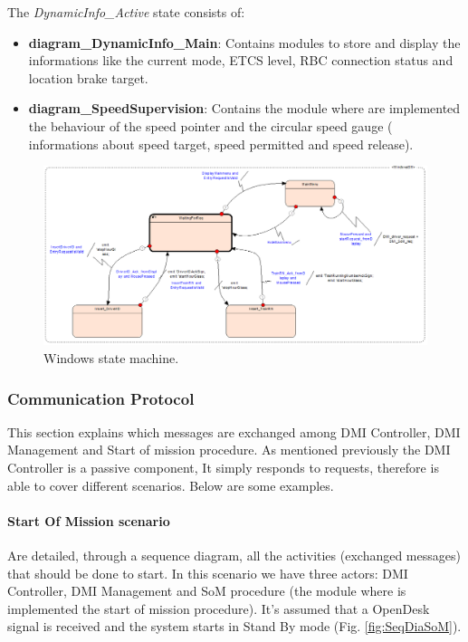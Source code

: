   The \textit{ DynamicInfo\_Active} state consists of:\\
  
  \begin{itemize}
  	\item \textbf{diagram\_DynamicInfo\_Main}: Contains modules to store and display the informations like the current mode, ETCS level, RBC connection status and location brake target.
  	\item \textbf{diagram\_SpeedSupervision}: Contains the module where are implemented the behaviour of the speed pointer and the circular speed gauge ( informations about speed target, speed permitted and speed release).
  \end{itemize}
  
  \begin{figure}
  	\centering
  	\includegraphics[width=\textwidth]{images/WindowSM}
  	\caption{Windows state machine.}\label{fig:win_sm}
  \end{figure}
  
\subsubsection{Communication Protocol}
This section explains which messages are exchanged among DMI Controller, DMI Management and Start of mission procedure. As mentioned previously the DMI Controller is a passive component, It simply responds to requests, therefore is able to cover different scenarios. Below are some examples.
  
  \paragraph{ Start Of Mission scenario} Are detailed, through a sequence diagram, all the activities (exchanged messages) that should be done to start. In this scenario we have three actors: DMI Controller, DMI Management and SoM procedure (the module where is implemented the start of mission procedure). It's assumed that a OpenDesk signal is received and the system starts in Stand By mode (Fig. \ref{fig:SeqDiaSoM}).
 
